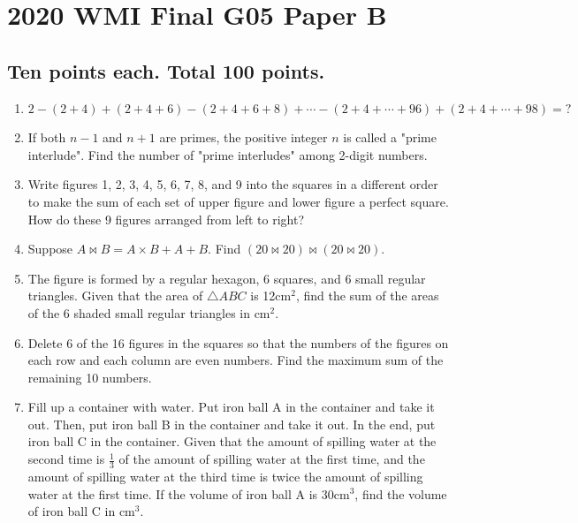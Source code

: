 \documentclass[12pt]{scrartcl}
\begin{document}
\section*{2020 WMI Final G05 Paper B}

\subsection*{Ten points each. Total 100 points.}

\begin{enumerate}
\item $2-(2+4)+(2+4+6)-(2+4+6+8)+\cdots-(2+4+\cdots+96)+(2+4+\cdots+98)=?$

\item If both $n-1$ and $n+1$ are primes, the positive integer $n$ is called a "prime interlude". Find the number of "prime interludes" among 2-digit numbers.

\item Write figures 1, 2, 3, 4, 5, 6, 7, 8, and 9 into the squares in a different order to make the sum of each set of upper figure and lower figure a perfect square. How do these 9 figures arranged from left to right?

\item Suppose $A \bowtie B = A \times B + A + B$. Find $(20 \bowtie 20) \bowtie (20 \bowtie 20)$.

\item The figure is formed by a regular hexagon, 6 squares, and 6 small regular triangles. Given that the area of $\triangle ABC$ is 12cm$^2$, find the sum of the areas of the 6 shaded small regular triangles in cm$^2$.

\item Delete 6 of the 16 figures in the squares so that the numbers of the figures on each row and each column are even numbers. Find the maximum sum of the remaining 10 numbers.

\item Fill up a container with water. Put iron ball A in the container and take it out. Then, put iron ball B in the container and take it out. In the end, put iron ball C in the container. Given that the amount of spilling water at the second time is $\frac{1}{3}$ of the amount of spilling water at the first time, and the amount of spilling water at the third time is twice the amount of spilling water at the first time. If the volume of iron ball A is 30cm$^3$, find the volume of iron ball C in cm$^3$.


\end{enumerate}
\end{document}
